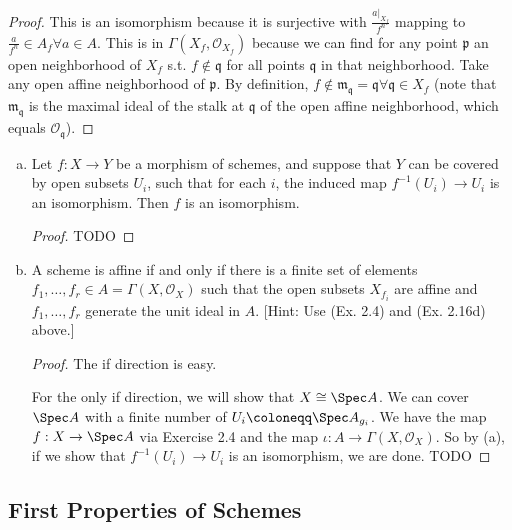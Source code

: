 \begin{exercise}
\begin{enumerate}[(a)]
\begin{proof}
		This is an isomorphism because it is surjective with $\frac{a|_{X_f}}{f^n} $ mapping to $\frac{a}{f^n} \in A_f \forall a\in A$.
		This is in $\Gamma(X_f,\mathcal{O}_{X_f}) $ because we can find for any point $\mathfrak{p} $ an open neighborhood of $X_f $ s.t. $f\notin \mathfrak{q}$ for all points $\mathfrak{q} $ in that neighborhood.
		Take any open affine neighborhood of $\mathfrak{p} $.
		By definition, $f\notin \mathfrak{m}_{\mathfrak{q}} = \mathfrak{q} \forall \mathfrak{q}\in X_f$ (note that $\mathfrak{m}_{\mathfrak{q}} $ is the maximal ideal of the stalk at $\mathfrak{q} $ of the open affine neighborhood, which equals $\mathcal{O}_ \mathfrak{q} $).
	\end{proof}
\end{enumerate}
\end{exercise}

\begin{exercise}%
\begin{enumerate}[(a)]
	\item Let $f:X\to Y $ be a morphism of schemes, and suppose that $Y $ can be covered by open subsets $U_i $, such that for each $i $, the induced map $f^{-1}(U_i)\to U_i $ is an isomorphism. Then $f $ is an isomorphism.
	\begin{proof}
		TODO
	\end{proof}
	\item A scheme is affine if and only if there is a finite set of elements $f_{1}, \ldots ,f_r \in A = \Gamma(X,\mathcal{O}_X) $ such that the open subsets $X_{f_i} $ are affine and $f_{1}, \ldots ,f_r $ generate the unit ideal in $A $.
		[Hint: Use (Ex. 2.4) and (Ex. 2.16d) above.]
	\begin{proof}
		The if direction is easy.

		For the only if direction, we will show that $X \cong \Spec A $.
		We can cover $\Spec A $ with a finite number of $U_i \coloneqq \Spec A_{g_i} $.
		We have the map $f: X\to \Spec A $ via Exercise 2.4 and the map $\iota :A\to \Gamma(X,\mathcal{O}_X) $.
		So by (a), if we show that $f^{-1}(U_i) \to U_i$ is an isomorphism, we are done.
		TODO
	\end{proof}
\end{enumerate}
\end{exercise}

\subsection{First Properties of Schemes}

